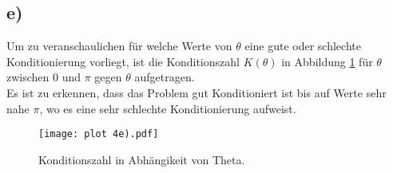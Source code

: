\subsection{e)}
Um zu veranschaulichen für welche Werte von $\theta$ eine gute oder schlechte Konditionierung vorliegt, ist die Konditionszahl $K\left( \theta \right)$
in Abbildung \ref{fig:a4eA1} für $\theta$ zwischen $0$ und $\pi$ gegen $\theta$ aufgetragen.
\\
Es ist zu erkennen, dass das Problem gut Konditioniert ist bis auf Werte sehr nahe $\pi$, wo es eine sehr schlechte Konditionierung aufweist.
\FloatBarrier
\begin{figure}
  \centering
  \texttt{[image: plot 4e).pdf]}
  \caption{Konditionszahl in Abhängikeit von Theta.}
  \label{fig:a4eA1}
\end{figure}
\FloatBarrier
